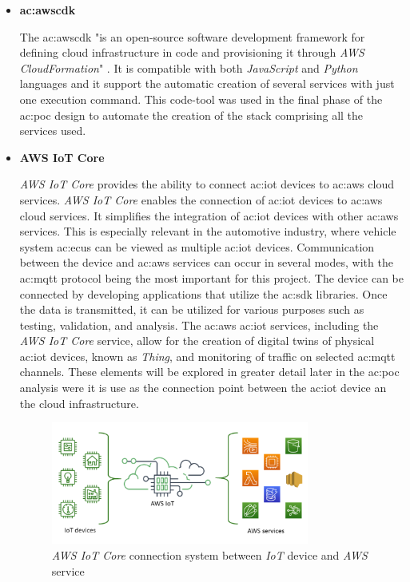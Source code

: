 \begin{itemize}
    \item[] \textbf{\gls{ac:awscdk}} 
    
    The \gls{ac:awscdk} "is an open-source software development framework for defining cloud infrastructure in code and provisioning it through \textit{AWS CloudFormation}" \cite{WhatIsTheAWSCDK}. It is compatible with both \textit{JavaScript} and \textit{Python} languages and it support the automatic creation of several services with just one execution command. This code-tool was used in the final phase of the \gls{ac:poc} design to automate the creation of the stack comprising all the services used.
    
    \item[] \textbf{AWS IoT Core} 
    
    \textit{AWS IoT Core} provides the ability to connect \gls{ac:iot} devices to \gls{ac:aws} cloud services. \textit{AWS IoT Core} enables the connection of \gls{ac:iot} devices to \gls{ac:aws} cloud services. It simplifies the integration of \gls{ac:iot} devices with other \gls{ac:aws} services. This is especially relevant in the automotive industry, where vehicle system \gls{ac:ecu}s can be viewed as multiple \gls{ac:iot} devices. Communication between the device and \gls{ac:aws} services can occur in several modes, with the \gls{ac:mqtt} protocol being the most important for this project. The device can be connected by developing applications that utilize the \gls{ac:sdk} libraries. Once the data is transmitted, it can be utilized for various purposes such as testing, validation, and analysis. The \gls{ac:aws} \gls{ac:iot} services, including the \textit{AWS IoT Core} service, allow for the creation of digital twins of physical \gls{ac:iot} devices, known as \textit{Thing}, and monitoring of traffic on selected \gls{ac:mqtt} channels. These elements will be explored in greater detail later in the \gls{ac:poc} analysis were it is use as the connection point between the \gls{ac:iot} device an the cloud infrastructure.
    \begin{figure}[h]  %
        \centering
        \includegraphics[width=0.8\textwidth]{images/AWSIoTCore.png}  %
        \caption{\textit{AWS IoT Core} connection system between \textit{IoT} device and \textit{AWS} service \cite{AWSIoTCore}}
        \label{fig:AWSIoTCore}
    \end{figure}


\end{itemize}

